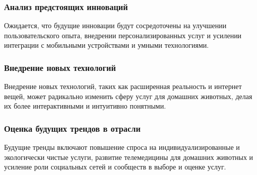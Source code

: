 \subsubsection{Анализ предстоящих инноваций}

Ожидается, что будущие инновации будут сосредоточены на улучшении пользовательского опыта, внедрении персонализированных услуг и усилении интеграции с мобильными устройствами и умными технологиями.
\subsubsection{Внедрение новых технологий}

Внедрение новых технологий, таких как расширенная реальность и интернет вещей, может радикально изменить сферу услуг для домашних животных, делая их более интерактивными и интуитивно понятными.
\subsubsection{Оценка будущих трендов в отрасли}

Будущие тренды включают повышение спроса на индивидуализированные и экологически чистые услуги, развитие телемедицины для домашних животных и усиление роли социальных сетей и сообществ в выборе и оценке услуг.